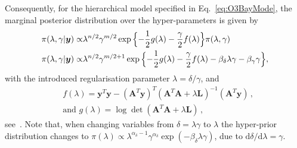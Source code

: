 Consequently, for the hierarchical model specified in Eq.~\ref{eq:O3BayMode}, the marginal posterior distribution over the hyper-parameters is given by
\begin{align}
	\pi(\lambda, \gamma | \bm{y})
	\propto & \lambda^{n/2} \gamma^{m/2 }   \exp{ \Bigl\{ - \frac{1}{2} g ( \lambda) - \frac{\gamma}{2} f ( \lambda) \Bigr\} } \pi(\lambda, \gamma) \\
		\pi(\lambda, \gamma | \bm{y})
	\propto &  \lambda^{n/2} \gamma^{m/2 + 1}   \exp{ \Bigl\{ - \frac{1}{2} g ( \lambda) - \frac{\gamma}{2} f ( \lambda) - \beta_{\delta} \lambda  \gamma - \beta_{\gamma} \gamma \Bigr\}},
	\label{eq:MargPostAppl}
\end{align}
with the introduced regularisation parameter $\lambda = \delta / \gamma$, and
\begin{subequations}
	\label{eq:fandg}
	\begin{align}
		&f ( \lambda) = \bm{y}^T \bm{y} - (\bm{A}^T \bm{y})^T (\bm{A}^T  \bm{A} + \lambda \bm{L})^{-1} (\bm{A}^T \bm{y})  \label{eq:fAppl} \, ,  \\
		&\text{and } g(\lambda) = \log \det (\bm{A}^T  \bm{A} + \lambda \bm{L}) \label{eq:gAppl} \, ,
	\end{align}
\end{subequations}
see~\cite[Lemma 2]{fox2016fast}.
Note that, when changing variables from $\delta = \lambda \gamma$ to $\lambda$ the hyper-prior distribution changes to $\pi(\lambda) \propto \lambda^{\alpha_\delta-1} \gamma^{\alpha_\delta} \exp{(- \beta_\delta \lambda  \gamma)} $, due to $\text{d}\delta / \text{d} \lambda = \gamma$.
